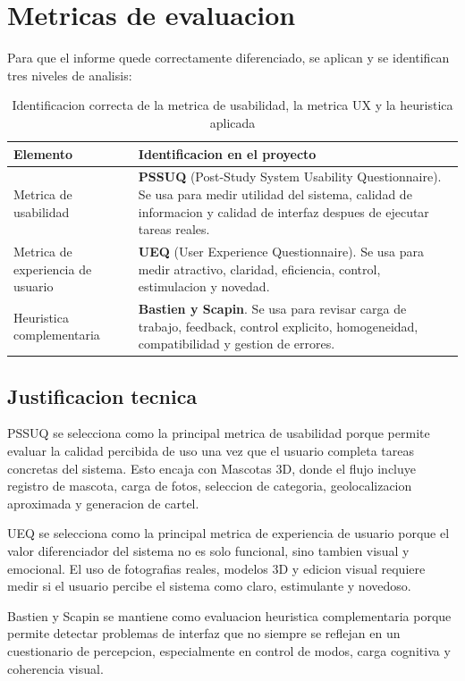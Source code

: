 \documentclass[12pt,a4paper]{article}
\begin{document}
\section{Metricas de evaluacion}
Para que el informe quede correctamente diferenciado, se aplican y se identifican tres niveles de analisis:

\begin{table}[H]
\centering
\small
\begin{tabularx}{\textwidth}{@{}p{4.0cm}Y@{}}
\toprule
\textbf{Elemento} & \textbf{Identificacion en el proyecto} \\
\midrule
Metrica de usabilidad & \textbf{PSSUQ} (Post-Study System Usability Questionnaire). Se usa para medir utilidad del sistema, calidad de informacion y calidad de interfaz despues de ejecutar tareas reales. \\
Metrica de experiencia de usuario & \textbf{UEQ} (User Experience Questionnaire). Se usa para medir atractivo, claridad, eficiencia, control, estimulacion y novedad. \\
Heuristica complementaria & \textbf{Bastien y Scapin}. Se usa para revisar carga de trabajo, feedback, control explicito, homogeneidad, compatibilidad y gestion de errores. \\
\bottomrule
\end{tabularx}
\caption{Identificacion correcta de la metrica de usabilidad, la metrica UX y la heuristica aplicada}
\end{table}

\subsection{Justificacion tecnica}
PSSUQ se selecciona como la principal metrica de usabilidad porque permite evaluar la calidad percibida de uso una vez que el usuario completa tareas concretas del sistema. Esto encaja con Mascotas 3D, donde el flujo incluye registro de mascota, carga de fotos, seleccion de categoria, geolocalizacion aproximada y generacion de cartel.

UEQ se selecciona como la principal metrica de experiencia de usuario porque el valor diferenciador del sistema no es solo funcional, sino tambien visual y emocional. El uso de fotografias reales, modelos 3D y edicion visual requiere medir si el usuario percibe el sistema como claro, estimulante y novedoso.

Bastien y Scapin se mantiene como evaluacion heuristica complementaria porque permite detectar problemas de interfaz que no siempre se reflejan en un cuestionario de percepcion, especialmente en control de modos, carga cognitiva y coherencia visual.
\end{document}
